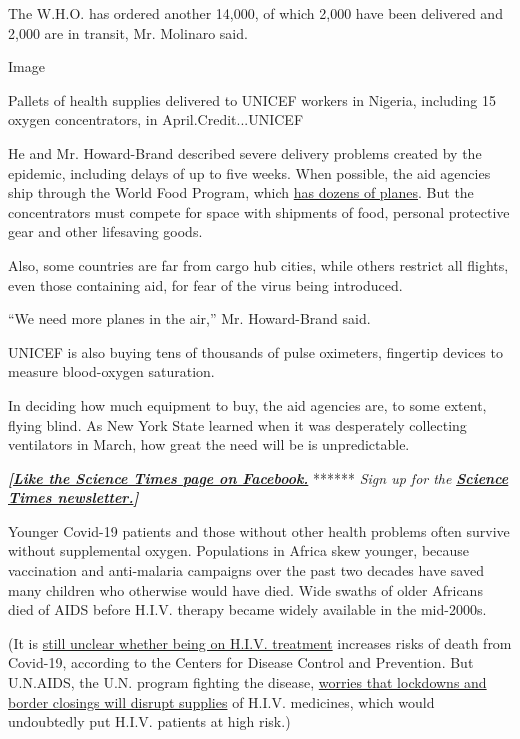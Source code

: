The W.H.O. has ordered another 14,000, of which 2,000 have been
delivered and 2,000 are in transit, Mr. Molinaro said.

Image

Pallets of health supplies delivered to UNICEF workers in Nigeria,
including 15 oxygen concentrators, in April.Credit...UNICEF

He and Mr. Howard-Brand described severe delivery problems created by
the epidemic, including delays of up to five weeks. When possible, the
aid agencies ship through the World Food Program, which
\href{https://www.wfp.org/publications/wfp-aviation-2018}{has dozens of
planes}. But the concentrators must compete for space with shipments of
food, personal protective gear and other lifesaving goods.

Also, some countries are far from cargo hub cities, while others
restrict all flights, even those containing aid, for fear of the virus
being introduced.

``We need more planes in the air,'' Mr. Howard-Brand said.

UNICEF is also buying tens of thousands of pulse oximeters, fingertip
devices to measure blood-oxygen saturation.

In deciding how much equipment to buy, the aid agencies are, to some
extent, flying blind. As New York State learned when it was desperately
collecting ventilators in March, how great the need will be is
unpredictable.

\textbf{\emph{{[}}\href{http://on.fb.me/1paTQ1h}{\emph{Like the Science
Times page on Facebook.}}} ****** \emph{\textbar{} Sign up for the}
\textbf{\href{http://nyti.ms/1MbHaRU}{\emph{Science Times
newsletter.}}\emph{{]}}}

Younger Covid-19 patients and those without other health problems often
survive without supplemental oxygen. Populations in Africa skew younger,
because vaccination and anti-malaria campaigns over the past two decades
have saved many children who otherwise would have died. Wide swaths of
older Africans died of AIDS before H.I.V. therapy became widely
available in the mid-2000s.

(It is
\href{https://www.hiv.gov/hiv-basics/staying-in-hiv-care/other-related-health-issues/coronavirus-covid-19}{still
unclear whether being on H.I.V. treatment} increases risks of death from
Covid-19, according to the Centers for Disease Control and Prevention.
But U.N.AIDS, the U.N. program fighting the disease,
\href{https://www.voanews.com/science-health/un-warns-risk-low-distribution-aids-drug-amid-covid-lockdowns}{worries
that lockdowns and border closings will disrupt supplies} of H.I.V.
medicines, which would undoubtedly put H.I.V. patients at high risk.)

